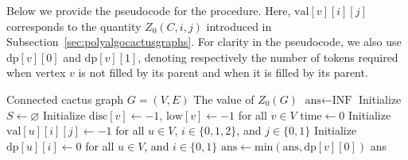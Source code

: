 \documentclass[11pt]{article}
\theoremstyle{plain}
\theoremstyle{definition}
\theoremstyle{remark}
\begin{document}
Below we provide the pseudocode for the procedure. Here, $\text{val}[v][i][j]$ corresponds to the quantity $Z_0(C,i,j)$ introduced in Subsection~\ref{sec:polyalgocactusgraphs}. For clarity in the pseudocode, we also use $\text{dp}[v][0]$ and $\text{dp}[v][1]$, denoting respectively the number of tokens required when vertex $v$ is not filled by its parent and when it is filled by its parent.


\begin{algorithm}[H]
\caption{Compute $Z_0(G)$}
\label{alg:find-z0}
\begin{algorithmic}[1]
\Require Connected cactus graph $G = (V,E)$
\Ensure The value of $Z_0(G)$
\State $\text{ans} \gets \text{INF}$
    \State Initialize $S \gets \varnothing $ 
    \State Initialize $\text{disc}[v] \gets -1$, $\text{low}[v] \gets -1$ for all $v \in V$
    \State $\text{time} \gets 0$
    \State Initialize $\text{val}[u][i][j] \gets -1 $ for all $u \in V$, $i \in \{0,1,2\}$, and $j\in \{0,1\}$
    \State Initialize $\text{dp}[u][i] \gets 0$ for all $u \in V$, and $i \in \{0,1\}$
    \State {}
    \State $\text{ans} \gets \text{min}(\text{ans}, \text{dp}[v][0])$
\EndFor
\State \Return ans
\end{algorithmic}
\end{algorithm}
\end{document}
